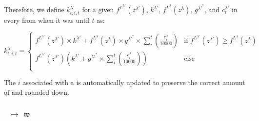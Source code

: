 \documentclass[class=article, crop=false]{standalone}
\begin{document}
\begin{enumerate}
    Therefore, we define $k_{t,i,t}^{\lambda'}$ for a given $f^{L^{\lambda'}}(z^{\lambda'})$, $k^{\lambda'}$, $f^{L^{\lambda}}(z^{\lambda})$, $g^{\lambda'^{*}}$, and $c_{t}^{\lambda'}$ in every  from when it was  until $t$ as:

        \begin{adjustwidth}{-2cm}{-2cm}
        $$
            k_{t,i,t}^{\lambda'} = 
                \begin{cases}
                    f^{L^{\lambda'}}(z^{\lambda'}) 
                    \times 
                    k^{\lambda'} +
                    f^{L^{\lambda}}(z^{\lambda})
                    \times g^{\lambda'^{*}} \times
                    \sum\limits_{i}^{t} 
                    \left
                        (\frac{c_{i}^{\lambda}}{10000}
                    \right) 
                        & \text{if } f^{L^{\lambda'}}(z^{\lambda'}) \geq f^{L^{\lambda}}(z^{\lambda}) \\
                    
                    f^{L^{\lambda'}}(z^{\lambda'}) 
                    \left( 
                        k^{\lambda'} + 
                        g^{\lambda'^{*}} \times
                        \sum\limits_{i}^{t} 
                        \left
                            (\frac{c_{i}^{\lambda}}{10000}
                        \right) 
                    \right)
                        & \text{else}\\
                \end{cases}
        $$
        \end{adjustwidth}

    The $i$ associated with a   is automatically updated to preserve the correct amount of  and rounded down.
    
\end{enumerate}


\subsubsection{\Pinto\ $\rightarrow$ $\mathfrak{w}$}
\end{document}
